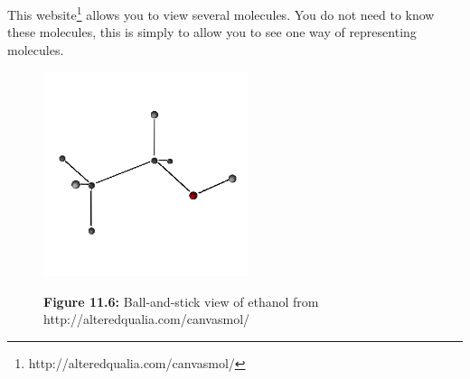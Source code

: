 \label{m38120*notfhsst!!!underscore!!!id112}

	\par
\label{m38120*uid8310432}This website\footnote{http://alteredqualia.com/canvasmol/}
         allows you to view several molecules. You do 
not need to know these molecules, this is simply to allow you to see one way of 
representing molecules. 
    \setcounter{subfigure}{0}
	\begin{figure}[H] %
    \begin{center}
    \label{m38120*uid101!!!underscore!!!media}\label{m38120*uid10123!!!underscore!!!printimage}\includegraphics[width=6cm]{col11305.imgs/m38120_canvasmol.png} %
      \vspace{2pt}
    \vspace{\rubberspace}\par \begin{cnxcaption}
	  \small \textbf{Figure 11.6: }Ball-and-stick view of ethanol from http://alteredqualia.com/canvasmol/\footnotemark{}
	\end{cnxcaption}
    \vspace{.1in}
    \end{center}
 \end{figure}   
    \addtocounter{footnote}{-1}
\par 
\label{m38120*secfhsst!!!underscore!!!id115}
